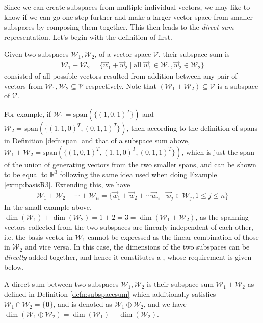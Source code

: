 Since we can create subspaces from multiple individual vectors, we may like to know if we can go one step further and make a larger vector space from smaller subspaces by composing them together. This then leads to the \textit{direct sum} representation. Let's begin with the definition of  first.
\begin{defn}
\label{defn:subspacesum}
Given two subspaces $\mathcal{W}_1, \mathcal{W}_2$, of a vector space $\mathcal{V}$, their subspace sum is
\begin{align*}
\mathcal{W}_1 + \mathcal{W}_2 = \{\vec{w}_1 + \vec{w}_2 \mid \text{all } \vec{w}_1 \in \mathcal{W}_1, \vec{w}_2 \in \mathcal{W}_2\}    
\end{align*}
consisted of all possible vectors resulted from addition between any pair of vectors from $\mathcal{W}_1, \mathcal{W}_2 \subseteq \mathcal{V}$ respectively. Note that $(\mathcal{W}_1 + \mathcal{W}_2) \subseteq \mathcal{V}$ is a subspace of $\mathcal{V}$.
\end{defn}
For example, if $\mathcal{W}_1 = \text{span}(\{(1,0,1)^T\})$ and $\mathcal{W}_2 = \text{span}(\{(1,1,0)^T, (0,1,1)^T\})$, then according to the definition of spans in Definition \ref{defn:span} and that of a subspace sum above, $\mathcal{W}_1 + \mathcal{W}_2 = \text{span}(\{(1,0,1)^T, (1,1,0)^T, (0,1,1)^T\})$, which is just the span of the union of generating vectors from the two smaller spans, and can be shown to be equal to $\mathbb{R}^3$ following the same idea used when doing Example \ref{exmp:basisR3}. Extending this, we have
\begin{align*}
\mathcal{W}_1 + \mathcal{W}_2 + \cdots + \mathcal{W}_n = \{\vec{w}_1 + \vec{w}_2 + \cdots \vec{w}_n \mid \vec{w}_j \in \mathcal{W}_j, 1 \leq j \leq n\}    
\end{align*}
In the small example above, $\dim(\mathcal{W}_1) + \dim(\mathcal{W}_2) = 1 + 2 = 3 = \dim(\mathcal{W}_1 + \mathcal{W}_2)$, as the spanning vectors collected from the two subspaces are linearly independent of each other, i.e. the basis vector in $\mathcal{W}_1$ cannot be expressed as the linear combination of those in $\mathcal{W}_2$ and vice versa. In this case, the dimensions of the two subspaces can be \textit{directly} added together, and hence it constitutes a , whose requirement is given below.
\begin{defn}
\label{defn:directsum}
A direct sum between two subspaces $\mathcal{W}_1, \mathcal{W}_2$ is their subspace sum $\mathcal{W}_1 + \mathcal{W}_2$ as defined in Definition \ref{defn:subspacesum} which additionally satisfies $\mathcal{W}_1 \cap \mathcal{W}_2 = \{\textbf{0}\}$, and is denoted as $\mathcal{W}_1 \oplus \mathcal{W}_2$, and we have $\dim(\mathcal{W}_1 \oplus \mathcal{W}_2) = \dim(\mathcal{W}_1) + \dim(\mathcal{W}_2)$.
\end{defn}
